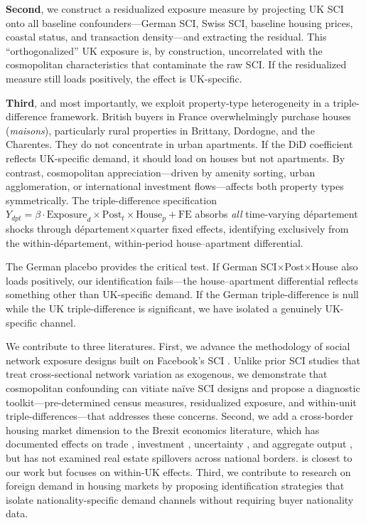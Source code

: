 \documentclass[12pt]{article}
\begin{document}
\textbf{Second}, we construct a residualized exposure measure by projecting UK SCI onto all baseline confounders---German SCI, Swiss SCI, baseline housing prices, coastal status, and transaction density---and extracting the residual. This ``orthogonalized'' UK exposure is, by construction, uncorrelated with the cosmopolitan characteristics that contaminate the raw SCI. If the residualized measure still loads positively, the effect is UK-specific.

\textbf{Third}, and most importantly, we exploit property-type heterogeneity in a triple-difference framework. British buyers in France overwhelmingly purchase houses (\textit{maisons}), particularly rural properties in Brittany, Dordogne, and the Charentes. They do not concentrate in urban apartments. If the DiD coefficient reflects UK-specific demand, it should load on houses but not apartments. By contrast, cosmopolitan appreciation---driven by amenity sorting, urban agglomeration, or international investment flows---affects both property types symmetrically. The triple-difference specification $Y_{dpt} = \beta \cdot \text{Exposure}_d \times \text{Post}_t \times \text{House}_p + \text{FE}$ absorbs \textit{all} time-varying d\'epartement shocks through d\'epartement$\times$quarter fixed effects, identifying exclusively from the within-d\'epartement, within-period house--apartment differential.

The German placebo provides the critical test. If German SCI$\times$Post$\times$House also loads positively, our identification fails---the house--apartment differential reflects something other than UK-specific demand. If the German triple-difference is null while the UK triple-difference is significant, we have isolated a genuinely UK-specific channel.

We contribute to three literatures. First, we advance the methodology of social network exposure designs built on Facebook's SCI \citep{bailey2018social, bailey2021international, bailey2018house, sablegreenberg2023social}. Unlike prior SCI studies that treat cross-sectional network variation as exogenous, we demonstrate that cosmopolitan confounding can vitiate na\"ive SCI designs and propose a diagnostic toolkit---pre-determined census measures, residualized exposure, and within-unit triple-differences---that addresses these concerns. Second, we add a cross-border housing market dimension to the Brexit economics literature, which has documented effects on trade \citep{breinlich2022costs}, investment \citep{breinlich2019voting}, uncertainty \citep{hassan2024global}, and aggregate output \citep{born2019costs, bloom2025brexit}, but has not examined real estate spillovers across national borders. \citet{mastrosavvas2024social} is closest to our work but focuses on within-UK effects. Third, we contribute to research on foreign demand in housing markets \citep{badarinza2019home, favara2015credit, saiz2010geographic} by proposing identification strategies that isolate nationality-specific demand channels without requiring buyer nationality data.
\end{document}
